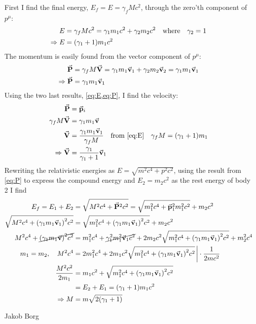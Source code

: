 \documentclass[11pt,a4paper]{report}
\newcounter{excount}[chapter]
\newenvironment{exercise}[1][]{\addtocounter{excount}{1} \noindent {\bf Problem
    \arabic{excount} \ \ #1}\hspace{2mm}}{\vspace{4mm}}
\newenvironment{solution}[1][]
    {\begin{tcolorbox}[title=Solution #1,halign lower=right,breakable]
    }
    {
    \tcblower Jakob Borg
    \end{tcolorbox}
	\vspace{5mm}
    }
\newcommand{\qwhere}
{
\qq{where}
}
\begin{document}
\begin{exercise}
\begin{solution}[\bf 2.b]
First I find the final energy, $E_f = E = \gamma_f M c^2$, through the zero'th component of $p^\mu$:
\begin{align}
E &= \gamma_f M c^2 = \gamma_1 m_1 c^2 + \gamma_2 m_2 c^2 \qwhere \gamma_2 = 1 \notag
\\
\Rightarrow E &= \qty(\gamma_1+1)m_1 c^2 \label{eq:E}
\end{align}
The momentum is easily found from the vector component of $p^\mu$:
\begin{align}
\va{P} &= \gamma_f M \va{V} = \gamma_1 m_1 \va{v}_1 + \gamma_2 m_2 \va{v}_2 = \gamma_1 m_1 \va{v}_1 \notag
\\
\Rightarrow \va{P} &= \gamma_1 m_1 \va{v}_1 \label{eq:P}
\end{align}
Using the two last results, \cref{eq:E,eq:P}, I find the velocity:
\begin{align}
\va{P} &= \va{p}_i \notag
\\
\gamma_f M \va{V} &= \gamma_1 m_1 \va{v}    \notag
\\
\va{V} &= \frac{\gamma_1m_1\va{v}_1}{\gamma_f M} \qq{from \cref{eq:E}} \gamma_f M = (\gamma_1+1)m_1 \notag
\\
\Rightarrow \va{V} &= \frac{\gamma_1}{\gamma_1+1}\va{v}_1 \label{eq:V}
\end{align}
Rewriting the relativistic energies as $E = \sqrt{m^2c^4+p^2c^2}$, using the result from \cref{eq:P} to express the compound energy and $E_2 = m_2c^2$ as the rest energy of body 2 I find
\begin{align}
E_f = E_1 + E_2 &= \sqrt{M^2c^4+\va{P}^2c^2} = \sqrt{m_1^2c^4+\va{p}_1^2m_1^2c^2} + m_2c^2 \notag
\\
\sqrt{M^2c^4 + \qty(\gamma_1m_1\va{v}_1)^2c^2} &= \sqrt{m_1^2c^4 + \qty(\gamma_1m_1\va{v}_1)^2c^2} + m_2c^2    \notag
\\
M^2c^4 +\cancel{\qty(\gamma_1m_1\va{v})^2c^2} &= m_1^2c^4+\cancel{\gamma_1^2m_1^2\va{v}_1c^2}+ 2m_2c^2\sqrt{m_1^2c^4 + \qty(\gamma_1m_1\va{v}_1)^2c^2} + m_2^2c^4    \notag
\\
m_1 = m_2 \qc M^2c^4 &= 2m_1^2c^4 + 2m_1c^2\sqrt{m_1^2c^4 + \qty(\gamma_1m_1\va{v}_1)^2c^2} \eval \cdot \frac{1}{2mc^2}   \notag
\\
\frac{M^2c^2}{2m_1} &= m_1c^2 + \sqrt{m_1^2c^4 + \qty(\gamma_1m_1\va{v}_1)^2c^2}     \notag
\\
&= E_2 + E_1 = \qty(\gamma_1+1)m_1c^2    \notag
\\
\Rightarrow M &= m\sqrt{2\qty(\gamma_1+1)} \label{eq:M}
\end{align}
\end{solution}


\end{exercise}
\end{document}
